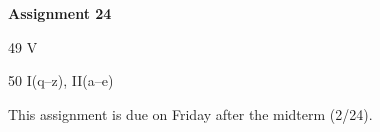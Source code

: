 \documentclass[12pt]{letter}
\begin{document}
\textbf{Assignment 24}

49 V

50 I(q--z), II(a--e)

This assignment is due on Friday after the midterm (2/24).
\end{document}
